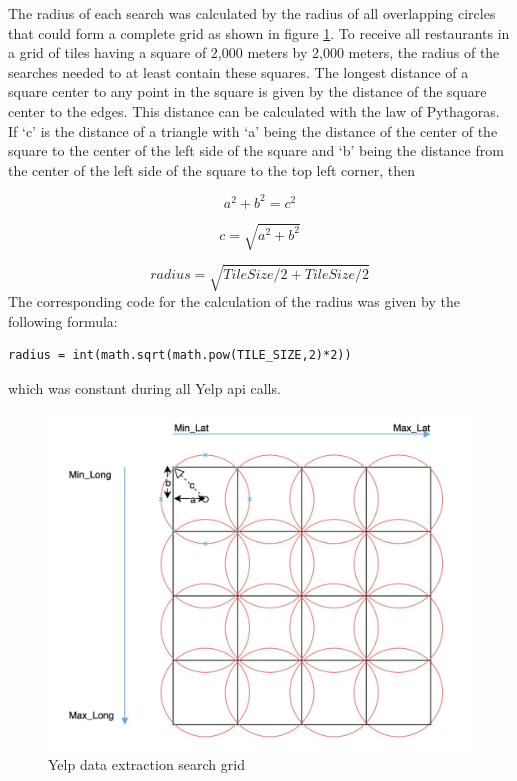 \documentclass[a4paper, 11pt, oneside]{Thesis}  %
\begin{document}
The radius of each search was calculated by the radius of all overlapping circles that could form a complete grid as shown in figure \ref{fig:Yelp_extraction_grid}. To receive all restaurants in a grid of tiles having a square of 2,000 meters by 2,000 meters, the radius of the searches needed to at least contain these squares. The longest distance of a square center to any point in the square is given by the distance of the square center to the edges. This distance can be calculated with the law of Pythagoras. If `c' is the distance of a triangle with `a' being the distance of the center of the square to the center of the left side of the square and `b' being the distance from the center of the left side of the square to the top left corner, then

\begin{equation}
 a^2 + b^2 = c^2
\end{equation}
 
\begin{equation}
 c = \sqrt{a^2+b^2}
\end{equation}
 
\begin{equation}
 radius = \sqrt{Tile Size/2 + Tile Size/2}
\end{equation}
The corresponding code for the calculation of the radius was given by the following formula:

\begin{verbatim}
radius = int(math.sqrt(math.pow(TILE_SIZE,2)*2))
\end{verbatim}

which was constant during all Yelp \ac{api} calls.

\begin{figure}[h]
\includegraphics[scale=0.4]{Figures/Yelp_extraction_grid.jpeg}
\centering
\caption{Yelp data extraction search grid}
\label{fig:Yelp_extraction_grid}
\end{figure}
\end{document}
